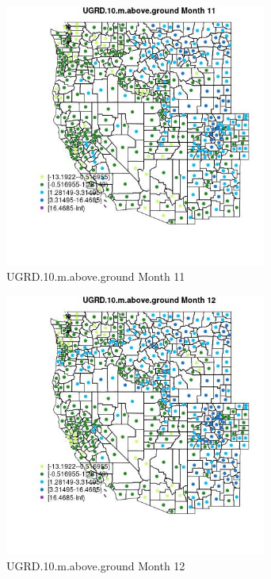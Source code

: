 \begin{figure} 
\centering  
\includegraphics[width=0.77\textwidth]{Code_Outputs/df_report_ML_predictors_CountyCentroid_Locations_Dates_2008-01-01to2018-12-31_MapObsMo11UGRD10maboveground.jpg} 
\caption{\label{fig:df_report_ML_predictors_CountyCentroid_Locations_Dates_2008-01-01to2018-12-31MapObsMo11UGRD10maboveground}UGRD.10.m.above.ground Month 11} 
\end{figure} 
 

\begin{figure} 
\centering  
\includegraphics[width=0.77\textwidth]{Code_Outputs/df_report_ML_predictors_CountyCentroid_Locations_Dates_2008-01-01to2018-12-31_MapObsMo12UGRD10maboveground.jpg} 
\caption{\label{fig:df_report_ML_predictors_CountyCentroid_Locations_Dates_2008-01-01to2018-12-31MapObsMo12UGRD10maboveground}UGRD.10.m.above.ground Month 12} 
\end{figure} 
 
